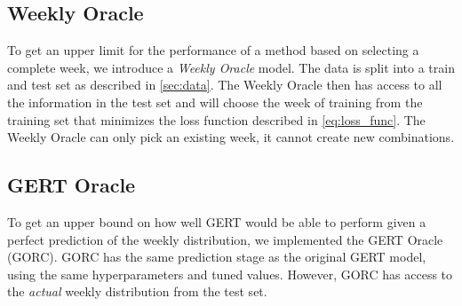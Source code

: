 \subsection{Weekly Oracle}
\label{sec:WORC}
To get an upper limit for the performance of a method based on selecting a complete week, we introduce a \textit{Weekly Oracle} model.
The data is split into a train and test set as described in \cref{sec:data}.
The Weekly Oracle then has access to all the information in the test set and will choose the week of training from the training set that minimizes the loss function described in \cref{eq:loss_func}.
The Weekly Oracle can only pick an existing week, it cannot create new combinations.

\subsection{GERT Oracle}
\label{sec:GORC}
To get an upper bound on how well GERT would be able to perform given a perfect prediction of the weekly distribution, we implemented the GERT Oracle (GORC). 
GORC has the same prediction stage as the original GERT model, using the same hyperparameters and tuned values.
However, GORC has access to the \textit{actual} weekly distribution from the test set.
